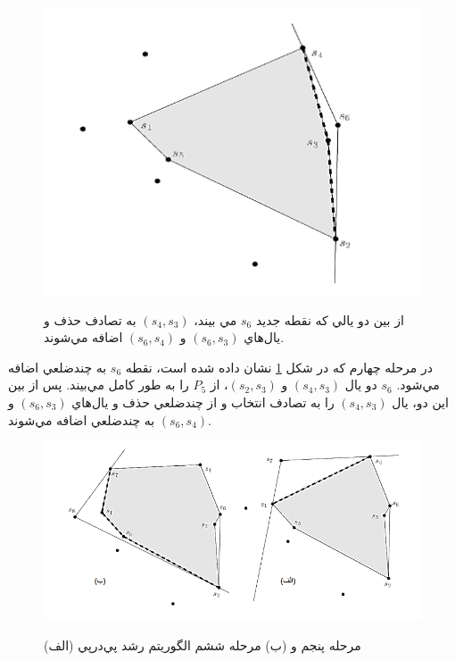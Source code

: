 \documentclass{book}
\begin{document}
\begin{figure}[h!]
    \begin{center}
        \includegraphics[width=\linewidth]{simp4.png}
        \label{simp4}
        \caption{از بين دو يالي که نقطه جديد $s_6$  مي بيند، $(s_4,s_3)$ به تصادف حذف و يال‌هاي $(s_6,s_3)$ و $(s_6,s_4)$ اضافه مي‌شوند.}
    \end{center}
\end{figure}

در مرحله چهارم که در شکل \ref{simp4} نشان داده شده است، نقطه $s_6$ به چندضلعي اضافه مي‌شود. $s_6$ دو يال $(s_4,s_3)$ و $(s_2,s_3)$، از $P_5$ را به ‌طور کامل مي‌بيند. پس از بين اين دو، يال $(s_4,s_3)$ را به تصادف انتخاب و از چندضلعي حذف و يال‌هاي $(s_6,s_3)$ و $(s_6,s_4)$ به چندضلعي اضافه مي‌شوند.

\begin{figure}[h!]
    \begin{center}
        \includegraphics[width=\linewidth]{simp5.png}
        \label{simp5}
        \caption{(الف) مرحله پنجم و (ب) مرحله ششم الگوريتم رشد پي‌درپي}
    \end{center}
\end{figure}
\end{document}
